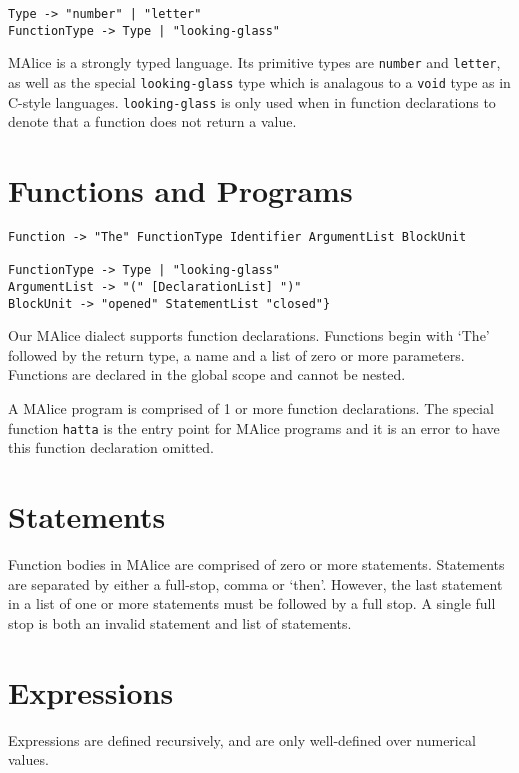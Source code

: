 \documentclass[a4wide, 11pt]{article}
\begin{document}
\begin{verbatim}
Type -> "number" | "letter"
FunctionType -> Type | "looking-glass"
\end{verbatim}

MAlice is a strongly typed language. Its primitive types are \texttt{number} and \texttt{letter}, as well as the special \texttt{looking-glass} type which is analagous to a \texttt{void} type as in C-style languages. \texttt{looking-glass} is only used when in function declarations to denote that a function does not return a value.

\section{Functions and Programs}

\begin{verbatim}
Function -> "The" FunctionType Identifier ArgumentList BlockUnit

FunctionType -> Type | "looking-glass"
ArgumentList -> "(" [DeclarationList] ")"
BlockUnit -> "opened" StatementList "closed"}
\end{verbatim}

Our MAlice dialect supports function declarations. Functions begin with `The' followed by the return type, a name and a list of zero or more parameters. Functions are declared in the global scope and cannot be nested.

A MAlice program is comprised of 1 or more function declarations. The special function \texttt{hatta} is the entry point for MAlice programs and it is an error to have this function declaration omitted.

\section{Statements}

Function bodies in MAlice are comprised of zero or more statements. Statements are separated by either a full-stop, comma or `then'. However, the last statement in a list of one or more statements must be followed by a full stop. A single full stop is both an invalid statement and list of statements.
  
\section{Expressions}

Expressions are defined recursively, and are only well-defined over numerical values.
\end{document}
